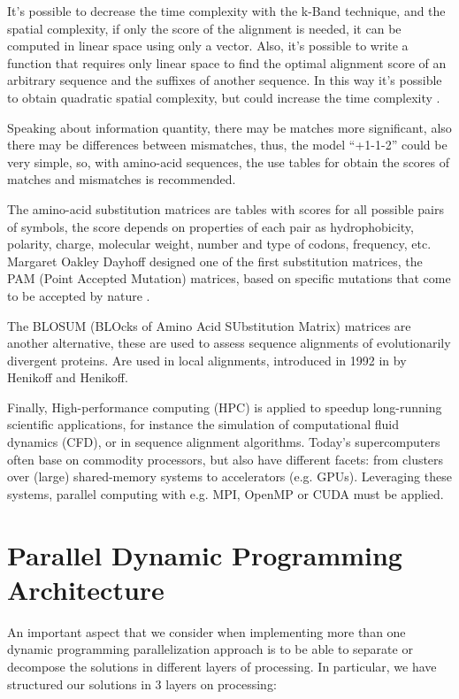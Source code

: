 \documentclass[journal]{IEEEtran}
\begin{document}
It's possible to decrease the time complexity with the k-Band technique, and the spatial complexity, if only the score of the alignment is needed, it can be computed in linear space using only a vector. Also, it's possible to write a function that requires only linear space to find the optimal alignment score of an arbitrary sequence and the suffixes  of another sequence. In this way it's possible to obtain quadratic spatial complexity, but could increase the time complexity \cite{hirschberg1975align}.

Speaking about information quantity, there may be matches more significant, also there may be differences between mismatches, thus, the model ``+1-1-2'' could be very simple, so, with amino-acid sequences, the use tables for obtain the scores of matches and mismatches is recommended.

The amino-acid substitution matrices are tables with scores for all possible pairs of symbols, the score depends on properties of each pair as hydrophobicity, polarity, charge, molecular weight, number and type of codons, frequency, etc. Margaret Oakley Dayhoff designed one of the first substitution matrices, the PAM (Point Accepted Mutation) matrices, based on specific mutations that come to be accepted by nature \cite{dayhoff1978align}.

The BLOSUM (BLOcks of Amino Acid SUbstitution Matrix) matrices are another alternative, these are used to assess sequence alignments of evolutionarily divergent proteins. Are used in local alignments, introduced in 1992 in \cite{henikoff1992align} by Henikoff and Henikoff.

Finally, High-performance computing (HPC) is applied to speedup long-running scientific applications, for instance the simulation of computational fluid dynamics (CFD), or in sequence alignment algorithms. Today's supercomputers often base on commodity processors, but also have different facets: from clusters over (large) shared-memory systems to accelerators (e.g. GPUs). Leveraging these systems, parallel computing with e.g. MPI, OpenMP or CUDA must be applied.

\section{Parallel Dynamic Programming Architecture}

An important aspect that we consider when implementing more than one dynamic programming parallelization approach is to be able to separate or decompose the solutions in different layers of processing. In particular, we have structured our solutions in 3 layers on processing:
\end{document}
